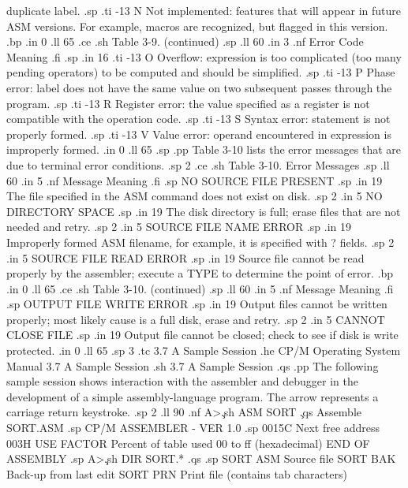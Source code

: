 duplicate label.
.sp
.ti -13
N            Not implemented:  features that will appear in future ASM 
versions.  For example, macros are recognized, but flagged in this 
version.
.bp
.in 0
.ll 65
.ce
.sh
Table 3-9.  (continued)
.sp
.ll 60
.in 3
.nf
Error Code                       Meaning
.fi
.sp
.in 16
.ti -13
O            Overflow:  expression is too complicated (too many 
pending operators) to be computed and should be simplified.
.sp
.ti -13
P            Phase error:  label does not have the same value on two 
subsequent passes through the program.
.sp
.ti -13
R            Register error:  the value specified as a register is not 
compatible with the operation code.
.sp
.ti -13
S            Syntax error:  statement is not properly formed.
.sp
.ti -13
V            Value error:  operand encountered in expression is 
improperly formed.
.in 0
.ll 65
.sp 
.pp
Table 3-10 lists the error messages that are due to terminal error 
conditions.  
.sp 2
.ce
.sh
Table 3-10.  Error Messages
.sp
.ll 60
.in 5
.nf
Message       Meaning
.fi
.sp
NO SOURCE FILE PRESENT       
.sp
.in 19
The file specified in the ASM command does not exist on disk.
.sp 2
.in 5
NO DIRECTORY SPACE           
.sp
.in 19
The disk directory is full; erase files that are not needed and retry.
.sp 2
.in 5
SOURCE FILE NAME ERROR       
.sp
.in 19
Improperly formed ASM filename, for example, it is specified with ? fields.
.sp 2
.in 5
SOURCE FILE READ ERROR       
.sp
.in 19
Source file cannot be read properly by the assembler; execute a 
TYPE to determine the point of error.
.bp
.in 0
.ll 65
.ce
.sh
Table 3-10.  (continued)
.sp
.ll 60
.in 5
.nf
Message       Meaning
.fi
.sp
OUTPUT FILE WRITE ERROR      
.sp
.in 19
Output files cannot be written properly; most likely cause is a full 
disk, erase and retry.
.sp 2
.in 5
CANNOT CLOSE FILE            
.sp
.in 19
Output file cannot be closed; check to see if disk is write protected.
.in 0
.ll 65
.sp 3
.tc    3.7  A Sample Session
.he CP/M Operating System Manual                3.7  A Sample Session
.sh
3.7  A Sample Session
.qs
.pp
The following sample session shows interaction with the assembler and 
debugger in the development of a simple assembly-language 
program.  The arrow represents a carriage return keystroke.
.sp 2
.ll 90
.nf
A>\c
.sh
ASM SORT      \c
.qs
Assemble SORT.ASM
.sp
CP/M ASSEMBLER - VER 1.0
.sp
0015C    Next free address
003H USE FACTOR    Percent of table used 00 to ff (hexadecimal)
END OF ASSEMBLY
.sp
A>\c
.sh
DIR SORT.*
.qs
.sp
SORT  ASM    Source file
SORT  BAK    Back-up from last edit
SORT  PRN    Print file (contains tab characters)
